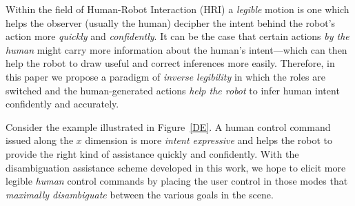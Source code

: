 \documentclass[conference]{IEEEtran}
\begin{document}

Within the field of Human-Robot Interaction (HRI) a \textit{legible} motion is one which helps the observer (usually the human) decipher the intent behind the robot's action more \textit{quickly} and \textit{confidently}. It can be the case that certain actions \textit{by the human} might carry more information about the human's intent---which can then help the robot to draw useful and correct inferences more easily. Therefore, in this paper we propose a paradigm of \textit{inverse legibility} in which the roles are switched and the human-generated actions \textit{help the robot} to infer human intent confidently and accurately. 

Consider the example illustrated in Figure~\ref{DE}. A human control command issued along the $x$ dimension is more \textit{intent expressive} and helps the robot to provide the right kind of assistance quickly and confidently. With the disambiguation assistance scheme developed in this work, we hope to elicit more legible \textit{human} control commands by placing the user control in those modes that \textit{maximally disambiguate} between the various goals in the scene. 
\end{document}
